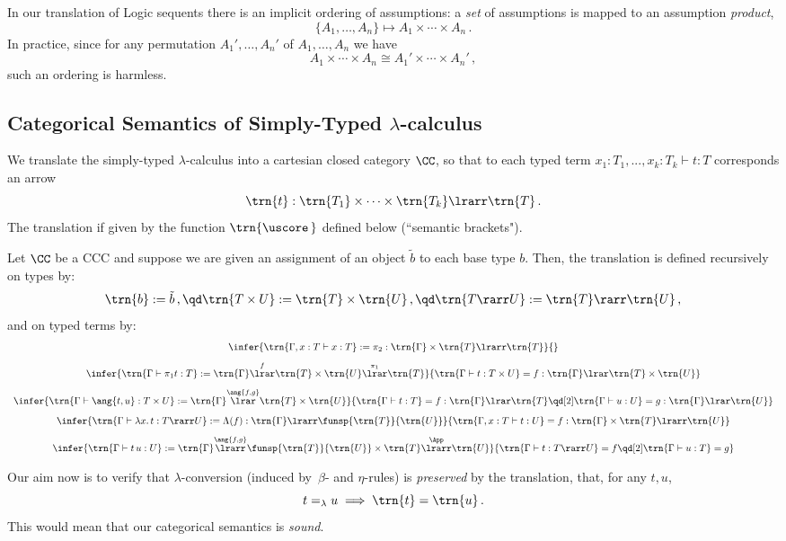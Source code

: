 \documentclass[12pt]{article}
\begin{document}
\begin{myremark}
In our translation of Logic sequents there is an implicit ordering of assumptions: a \emph{set} of assumptions is mapped to an assumption \emph{product},
\[ \{A_1,\dots,A_n\} \longmapsto A_1\times\cdots\times A_n\,. \]
In practice, since for any permutation $A_1',\dots,A_n'$ of $A_1,\dots,A_n$ we have
\[ A_1\times\cdots\times A_n \cong A_1'\times\cdots\times A_n'\,,\]
such an ordering is harmless.
\end{myremark}

\subsection{Categorical Semantics of Simply-Typed $\lambda$-calculus}

We translate the simply-typed $\lambda$-calculus into a cartesian closed category $\CC$, so that to each typed term $x_1:T_1,...,x_k:T_k\vdash t:T$
corresponds an arrow
\[ \trn{t}:\trn{T_1}\times\cdots\times\trn{T_k}\lrarr\trn{T}\,. \]
The translation if given by the function $\trn{\uscore\,}$ defined below (``semantic brackets").

\begin{mydefinition}\label{d:SemTr}
Let $\CC$ be a CCC and suppose we are given an assignment of an object $\tilde{b}$ to each base type $b$. Then, the translation is defined recursively
on types by:
\[ \trn{b}:=\tilde{b} \,,\qd \trn{T\times U}:=\trn{T}\times\trn{U} \,,\qd \trn{T\rarr U}:=\trn{T}\rarr\trn{U}\,, \]
and on typed terms by:
\[\begin{array}{c}
\infer{\trn{\Gamma,x:T\vdash x:T} := \pi_2:\trn{\Gamma}\times\trn{T}\lrarr\trn{T}}{}
\\[3mm]
\infer{\trn{\Gamma\vdash\pi_1 t:T}:=\trn{\Gamma}\overset{f}{\lrar}\trn{T}\times\trn{U}\overset{\pi_1}{\lrar}\trn{T}}{%
    \trn{\Gamma\vdash t:T\times U}=f:\trn{\Gamma}\lrar\trn{T}\times\trn{U}}
\\[3mm]
\infer{\trn{\Gamma\vdash \ang{t,u}:T\times U}:=\trn{\Gamma}\overset{\ang{f,g}}{\lrar}\trn{T}\times\trn{U}}{%
    \trn{\Gamma\vdash t:T}=f:\trn{\Gamma}\lrar\trn{T}\qd[2]\trn{\Gamma\vdash u:U}=g:\trn{\Gamma}\lrar\trn{U}}
\\[3mm]
\infer{\trn{\Gamma\vdash\lambda x.\,t:T\rarr U}:=\Lambda(f):\trn{\Gamma}\lrarr\funsp{\trn{T}}{\trn{U}}}{%
    \trn{\Gamma,x:T\vdash t:U}=f:\trn{\Gamma}\times\trn{T}\lrarr\trn{U}}
\\[3mm]
\infer{\trn{\Gamma\vdash t\,u: U}:=\trn{\Gamma}\overset{\ang{f,g}}{\lrarr}\funsp{\trn{T}}{\trn{U}}\times\trn{T}
    \overset{\App}{\lrarr}\trn{U}}{%
        \trn{\Gamma\vdash t:T\rarr U}=f\qd[2]\trn{\Gamma\vdash u:T}=g}
\end{array}\]\deq[-1]
\end{mydefinition}
%
Our aim now is to verify that $\lambda$-conversion (induced by~$\beta$- and $\eta$-rules) is \emph{preserved} by the translation, \ie that, for any
$t,u$,
\[ t=_\lambda u \implies \trn{t}=\trn{u}\,. \]
This would mean that our categorical semantics is \emph{sound}.
\end{document}
